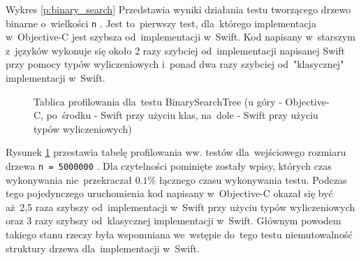 \documentclass[mgr, shortabstract]{iithesis}
\newcommand{\swiftinline}[1]{
    \texttt{#1}
}
\begin{document}
Wykres \ref{p:binary_search} Przedstawia wyniki działania testu tworzącego drzewo binarne o~wielkości \swiftinline{n}. Jest to~pierwszy test, dla~którego implementacja w~Objective-C jest szybsza od~implementacji w~Swift. Kod napisany w~starszym z~języków wykonuje się około 2 razy szybciej od~implementacji napisanej Swift przy pomocy typów wyliczeniowych i~ponad dwa razy szybciej od~"klasycznej" implementacji w~Swift. 

\begin{figure}
    \caption{Tablica profilowania dla~testu BinarySearchTree (u góry - Objective-C, po~środku - Swift przy użyciu klas, na~dole - Swift przy użyciu typów wyliczeniowych)}
    \label{i:binary_search}
\end{figure}

Rysunek \ref{i:binary_search} przestawia tabelę profilowania ww. testów dla~wejściowego rozmiaru drzewa \swiftinline{n = 5000000}. Dla czytelności pominięte zostały wpisy, których czas wykonywania nie~przekraczał $0.1\%$ łącznego czasu wykonywania testu. Podczas tego pojedynczego uruchomienia kod napisany w~Objective-C okazał się być aż~2,5 raza szybszy od~implementacji w~Swift przy użyciu typów wyliczeniowych oraz 3 razy szybszy od~klasycznej implementacji w~Swift. Głównym powodem takiego stanu rzeczy była wspomniana we~wstępie do~tego testu niemutowalność struktury drzewa dla~implementacji w~Swift. 
\end{document}
